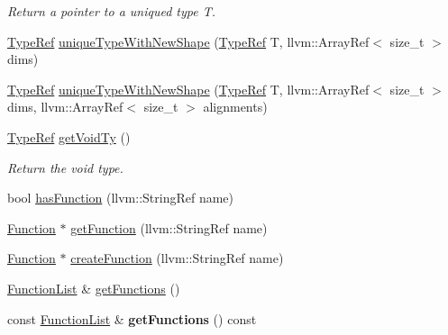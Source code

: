 \begin{DoxyCompactItemize}
\begin{DoxyCompactList}\small\item\em Return a pointer to a uniqued type {\ttfamily T}. \end{DoxyCompactList}\item 
\hyperlink{structglow_1_1_type}{Type\+Ref} \hyperlink{classglow_1_1_module_a0059ec63c41976b08ccfb50e1c8fa020}{unique\+Type\+With\+New\+Shape} (\hyperlink{structglow_1_1_type}{Type\+Ref} T, llvm\+::\+Array\+Ref$<$ size\+\_\+t $>$ dims)
\item 
\hyperlink{structglow_1_1_type}{Type\+Ref} \hyperlink{classglow_1_1_module_aed10d548f781d837e842690c1810e784}{unique\+Type\+With\+New\+Shape} (\hyperlink{structglow_1_1_type}{Type\+Ref} T, llvm\+::\+Array\+Ref$<$ size\+\_\+t $>$ dims, llvm\+::\+Array\+Ref$<$ size\+\_\+t $>$ alignments)
\item 
\mbox{\label{classglow_1_1_module_a2c95f21c93c71aaac799638287bb2dc6}} 
\hyperlink{structglow_1_1_type}{Type\+Ref} \hyperlink{classglow_1_1_module_a2c95f21c93c71aaac799638287bb2dc6}{get\+Void\+Ty} ()
\begin{DoxyCompactList}\small\item\em Return the void type. \end{DoxyCompactList}\item 
bool \hyperlink{classglow_1_1_module_aedef87903f635a844d4d45a2b43aaf03}{has\+Function} (llvm\+::\+String\+Ref name)
\item 
\hyperlink{classglow_1_1_function}{Function} $\ast$ \hyperlink{classglow_1_1_module_a3c3312d6bcf9f805037de85a0aee0e39}{get\+Function} (llvm\+::\+String\+Ref name)
\item 
\hyperlink{classglow_1_1_function}{Function} $\ast$ \hyperlink{classglow_1_1_module_a4659c5ffb8ce5f876bb8ae0217dfbd2c}{create\+Function} (llvm\+::\+String\+Ref name)
\item 
\hyperlink{namespaceglow_ae6f6f350877931e8074457bbab671b5f}{Function\+List} \& \hyperlink{classglow_1_1_module_a88ea3d6d180c7bc843e5258ca625a416}{get\+Functions} ()
\item 
\mbox{\label{classglow_1_1_module_ae6dad42e3263deefa3d6ec6af75dde0f}} 
const \hyperlink{namespaceglow_ae6f6f350877931e8074457bbab671b5f}{Function\+List} \& {\bfseries get\+Functions} () const
\item 
\mbox{\label{classglow_1_1_module_aa6f3539108b1e2e1332d26699beeef45}} 

\end{DoxyCompactItemize}
